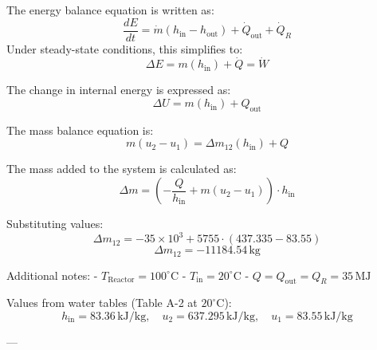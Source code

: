 The energy balance equation is written as:  
\[
\frac{dE}{dt} = \dot{m} (h_{\text{in}} - h_{\text{out}}) + \dot{Q}_{\text{out}} + \dot{Q}_R
\]  
Under steady-state conditions, this simplifies to:  
\[
\Delta E = m (h_{\text{in}}) + \dot{Q} = \dot{W}
\]  

The change in internal energy is expressed as:  
\[
\Delta U = m (h_{\text{in}}) + Q_{\text{out}}
\]  

The mass balance equation is:  
\[
m (u_2 - u_1) = \Delta m_{12} (h_{\text{in}}) + Q
\]  

The mass added to the system is calculated as:  
\[
\Delta m = \left( -\frac{Q}{h_{\text{in}}} + m (u_2 - u_1) \right) \cdot h_{\text{in}}
\]  

Substituting values:  
\[
\Delta m_{12} = -35 \times 10^3 + 5755 \cdot (437.335 - 83.55)
\]  
\[
\Delta m_{12} = -11184.54 \, \text{kg}
\]  

Additional notes:  
- \( T_{\text{Reactor}} = 100^\circ\text{C} \)  
- \( T_{\text{in}} = 20^\circ\text{C} \)  
- \( Q = Q_{\text{out}} = Q_R = 35 \, \text{MJ} \)  

Values from water tables (Table A-2 at \( 20^\circ\text{C} \)):  
\[
h_{\text{in}} = 83.36 \, \text{kJ/kg}, \quad u_2 = 637.295 \, \text{kJ/kg}, \quad u_1 = 83.55 \, \text{kJ/kg}
\]  

---